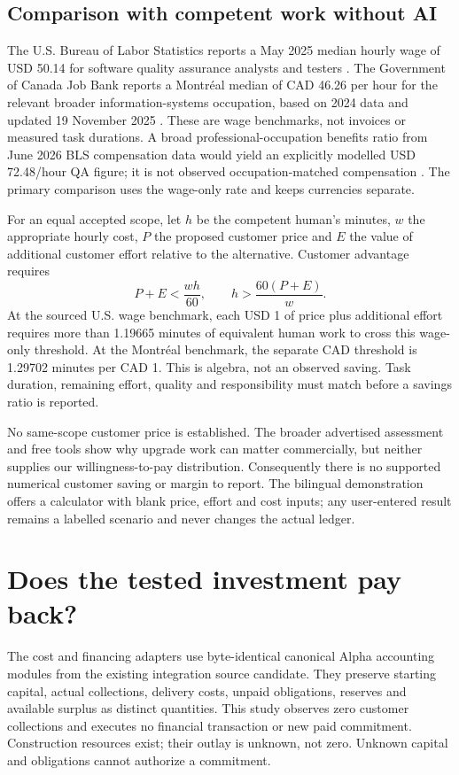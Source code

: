 \documentclass[11pt,letterpaper]{article}
\begin{document}
\subsection{Comparison with competent work without AI}
The U.S. Bureau of Labor Statistics reports a May 2025 median hourly wage of USD 50.14 for software quality assurance analysts and testers \cite{bls-wage}. The Government of Canada Job Bank reports a Montréal median of CAD 46.26 per hour for the relevant broader information-systems occupation, based on 2024 data and updated 19 November 2025 \cite{jobbank}. These are wage benchmarks, not invoices or measured task durations. A broad professional-occupation benefits ratio from June 2026 BLS compensation data would yield an explicitly modelled USD 72.48/hour QA figure; it is not observed occupation-matched compensation \cite{bls-ecec}. The primary comparison uses the wage-only rate and keeps currencies separate.

For an equal accepted scope, let $h$ be the competent human's minutes, $w$ the appropriate hourly cost, $P$ the proposed customer price and $E$ the value of additional customer effort relative to the alternative. Customer advantage requires
\[
             P + E < \frac{wh}{60},
\qquad h > \frac{60(P+E)}{w}.
\]
At the sourced U.S. wage benchmark, each USD 1 of price plus additional effort requires more than 1.19665 minutes of equivalent human work to cross this wage-only threshold. At the Montréal benchmark, the separate CAD threshold is 1.29702 minutes per CAD 1. This is algebra, not an observed saving. Task duration, remaining effort, quality and responsibility must match before a savings ratio is reported.

No same-scope customer price is established. The broader advertised assessment and free tools show why upgrade work can matter commercially, but neither supplies our willingness-to-pay distribution. Consequently there is no supported numerical customer saving or margin to report. The bilingual demonstration offers a calculator with blank price, effort and cost inputs; any user-entered result remains a labelled scenario and never changes the actual ledger.

\section{Does the tested investment pay back?}
The cost and financing adapters use byte-identical canonical Alpha accounting modules from the existing integration source candidate. They preserve starting capital, actual collections, delivery costs, unpaid obligations, reserves and available surplus as distinct quantities. This study observes zero customer collections and executes no financial transaction or new paid commitment. Construction resources exist; their outlay is unknown, not zero. Unknown capital and obligations cannot authorize a commitment.
\end{document}
